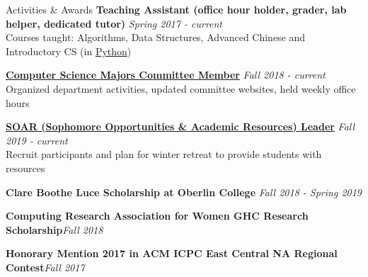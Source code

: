 \documentclass{resume}
\begin{document}
\begin{rSection}{Activities \& Awards}
{\bf Teaching Assistant (office hour holder, grader, lab helper, dedicated tutor)} \hfill {\em Spring 2017 - current} \\
Courses taught: Algorithms, Data Structures, Advanced Chinese and Introductory CS (in \underline{Python})

\href{http://www.cs.oberlin.edu/~csmc/officers.php}{\textbf{Computer Science Majors Committee Member}} \hfill {\em Fall 2018 - current} \\
Organized department activities, updated committee websites, held weekly office hours


{\bf \href{https://www.oberlin.edu/career/set/soar/soar-leaders}{SOAR (Sophomore Opportunities \& Academic Resources) Leader}} \hfill{\em Fall 2019 - current} \\
Recruit participants and plan for winter retreat to provide students with resources

{\bf Clare Boothe Luce Scholarship at Oberlin College} \hfill{\em Fall 2018 - Spring 2019}

{\bf Computing Research Association for Women GHC Research Scholarship}\hfill{\em Fall 2018}

{\bf Honorary Mention 2017 in ACM ICPC East Central NA Regional Contest}\hfill{\em Fall 2017}


\end{rSection}
\end{document}
